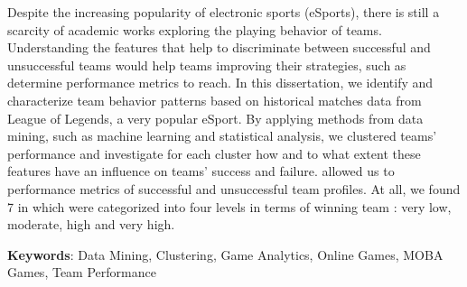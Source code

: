 Despite the increasing popularity of electronic sports (eSports), there is still a scarcity of academic works exploring the playing behavior of teams. Understanding the features that help to discriminate between successful and unsuccessful teams would help teams improving their strategies, such as determine performance metrics to reach. In this dissertation, we identify and characterize team behavior patterns based on historical matches data from League of Legends, a very popular eSport. By applying methods from data mining, such as machine learning and statistical analysis, we clustered teams' performance and investigate for each cluster how and to what extent these features have an influence on teams' success and failure.  allowed us to  performance metrics of successful and unsuccessful team profiles. At all, we found 7  in which were categorized into four levels in terms of winning team : very low, moderate, high and very high.

\textbf{Keywords}: Data Mining, Clustering, Game Analytics, Online Games, MOBA Games, Team Performance